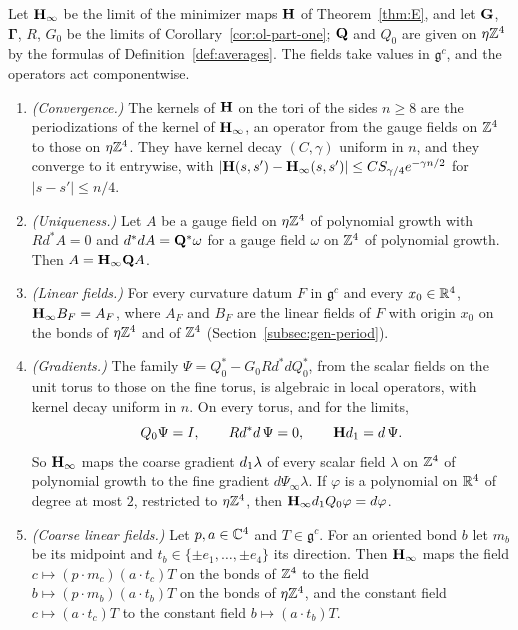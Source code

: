 \begin{proposition}\label{prop:ol-IM}
Let $\mathbf H_\infty$ be the limit of the minimizer maps $\mathbf H$ of Theorem~\ref{thm:E}, and let $\mathbf G$, $\boldsymbol\Gamma$, $R$, $G_0$ be the limits of Corollary~\ref{cor:ol-part-one}; $\mathbf Q$ and $Q_0$ are given on $\eta\mathbb Z^4$ by the formulas of Definition~\ref{def:averages}. The fields take values in $\mathfrak g^c$, and the operators act componentwise.
\begin{enumerate}[label=(\alph*)]
\item \emph{(Convergence.)} The kernels of $\mathbf H$ on the tori of the sides $n\ge8$ are the periodizations of the kernel of $\mathbf H_\infty$, an operator from the gauge fields on $\mathbb Z^4$ to those on $\eta\mathbb Z^4$. They have kernel decay $(C,\gamma)$ uniform in $n$, and they converge to it entrywise, with $|\mathbf H(s,s')-\mathbf H_\infty(s,s')|\le CS_{\gamma/4}e^{-\gamma n/2}$ for $|s-s'|\le n/4$.
\item \emph{(Uniqueness.)} Let $A$ be a gauge field on $\eta\mathbb Z^4$ of polynomial growth with $Rd^*A=0$ and $d^*dA=\mathbf Q^*\omega$ for a gauge field $\omega$ on $\mathbb Z^4$ of polynomial growth. Then $A=\mathbf H_\infty\mathbf Q A$.
\item \emph{(Linear fields.)} For every curvature datum $F$ in $\mathfrak g^c$ and every $x_0\in\mathbb R^4$, $\mathbf H_\infty B_F=A_F$, where $A_F$ and $B_F$ are the linear fields of $F$ with origin $x_0$ on the bonds of $\eta\mathbb Z^4$ and of $\mathbb Z^4$ (Section~\ref{subsec:gen-period}).
\item \emph{(Gradients.)} The family $\Psi=Q_0^*-G_0Rd^*dQ_0^*$, from the scalar fields on the unit torus to those on the fine torus, is algebraic in local operators, with kernel decay uniform in $n$. On every torus, and for the limits,
\[
Q_0\Psi=I,\qquad Rd^*d\,\Psi=0,\qquad\mathbf Hd_1=d\,\Psi .
\]
So $\mathbf H_\infty$ maps the coarse gradient $d_1\lambda$ of every scalar field $\lambda$ on $\mathbb Z^4$ of polynomial growth to the fine gradient $d\Psi_\infty\lambda$. If $\varphi$ is a polynomial on $\mathbb R^4$ of degree at most $2$, restricted to $\eta\mathbb Z^4$, then $\mathbf H_\infty d_1 Q_0\varphi=d\varphi$.
\item \emph{(Coarse linear fields.)} Let $p,a\in\mathbb C^4$ and $T\in\mathfrak g^c$. For an oriented bond $b$ let $m_b$ be its midpoint and $t_b\in\{\pm e_1,\dots,\pm e_4\}$ its direction. Then $\mathbf H_\infty$ maps the field $c\mapsto(p\cdot m_c)(a\cdot t_c)T$ on the bonds of $\mathbb Z^4$ to the field $b\mapsto(p\cdot m_b)(a\cdot t_b)T$ on the bonds of $\eta\mathbb Z^4$, and the constant field $c\mapsto(a\cdot t_c)T$ to the constant field $b\mapsto(a\cdot t_b)T$.
\end{enumerate}
\end{proposition}

